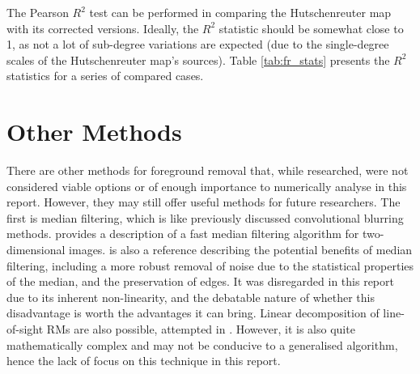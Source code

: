 The Pearson $R^2$ test can be performed in comparing the Hutschenreuter map with its corrected versions. Ideally, the $R^2$ statistic should be somewhat close to 1, as not a lot of sub-degree variations are expected (due to the single-degree scales of the Hutschenreuter map's sources). Table \ref{tab:fr_stats} presents the $R^2$ statistics for a series of compared cases.


\section{Other Methods}
\label{sec:other_methods}

There are other methods for foreground removal that, while researched, were not considered viable options or of enough importance to numerically analyse in this report. However, they may still offer useful methods for future researchers. The first is median filtering, which is like previously discussed convolutional blurring methods. \cite{ID39} provides a description of a fast median filtering algorithm for two-dimensional images. \cite{ID40} is also a reference describing the potential benefits of median filtering, including a more robust removal of noise due to the statistical properties of the median, and the preservation of edges. It was disregarded in this report due to its inherent non-linearity, and the debatable nature of whether this disadvantage is worth the advantages it can bring. Linear decomposition of line-of-sight RMs are also possible, attempted in \cite{ID21}. However, it is also quite mathematically complex and may not be conducive to a generalised algorithm, hence the lack of focus on this technique in this report.


